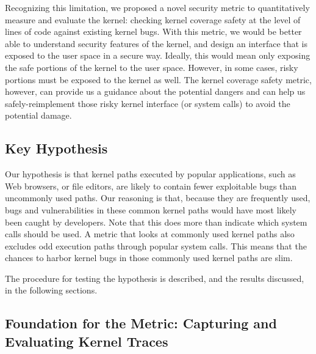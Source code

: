 Recognizing this limitation, we proposed a novel security metric to
quantitatively measure and evaluate the kernel: 
checking kernel coverage safety at the level of lines of code against
existing kernel bugs. 
With this metric, we would be better able to understand security features
of the kernel, 
and design an interface that is exposed to the user space in a secure way.
Ideally, 
this would mean only exposing the safe portions of the kernel to the user
space. 
However, in some cases, risky portions must be exposed to the kernel as
well. 
The kernel coverage safety metric, however, can provide us a guidance 
about the potential dangers and 
can help us safely-reimplement those risky kernel interface (or system
calls) to avoid the potential damage.









\subsection{Key Hypothesis}

Our hypothesis is that kernel paths executed by popular applications, 
such as Web browsers, or file editors, are likely to contain fewer
exploitable bugs 
than uncommonly used paths. Our reasoning is that, because they are
frequently used, 
bugs and vulnerabilities in these common kernel paths
would have most likely been caught by developers. 
Note that this does more than indicate which system calls should be used. 
A metric that looks at commonly used kernel paths also excludes odd
execution paths 
through popular system calls. 
This means that the chances to harbor kernel bugs in those commonly used
kernel paths are slim. 

The procedure for testing the hypothesis is described, and the results
discussed, in the following sections. 

\subsection{Foundation for the Metric: Capturing and Evaluating Kernel
Traces}

